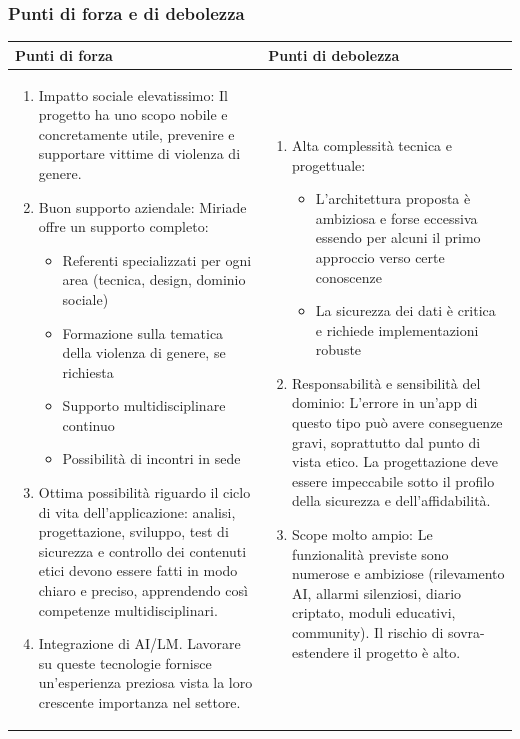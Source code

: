\documentclass[a4paper,11pt]{article}
\begin{document}
\subsubsection{Punti di forza e di debolezza}
{\footnotesize
\begin{tabularx}{\textwidth}{|X|X|}
\hline
\rowcolor{lightgray!40} %
\textbf{Punti di forza} & \textbf{Punti di debolezza} \\
\hline
\begin{enumerate}
\item Impatto sociale elevatissimo: Il progetto ha uno scopo nobile e concretamente utile, prevenire e supportare vittime di violenza di genere.
\item Buon supporto aziendale: Miriade offre un supporto completo:
\begin{itemize}
 \item Referenti specializzati per ogni area (tecnica, design, dominio sociale)
 \item Formazione sulla tematica della violenza di genere, se richiesta
 \item Supporto multidisciplinare continuo
 \item Possibilità di incontri in sede
\end{itemize}
\item Ottima possibilità riguardo il ciclo di vita dell'applicazione: analisi, progettazione, sviluppo, test di sicurezza e controllo dei contenuti etici devono essere fatti in modo chiaro e preciso, apprendendo così competenze multidisciplinari.
\item Integrazione di AI/LM. Lavorare su queste tecnologie fornisce un'esperienza preziosa vista la loro crescente importanza nel settore.
\end{enumerate}
 & \begin{enumerate}
\item Alta complessità tecnica e progettuale:
\begin{itemize}
 \item L'architettura proposta è ambiziosa e forse eccessiva essendo per alcuni il primo approccio verso certe conoscenze
 \item La sicurezza dei dati è critica e richiede implementazioni robuste
\end{itemize}
\item 	Responsabilità e sensibilità del dominio: L'errore in un'app di questo tipo può avere conseguenze gravi, soprattutto dal punto di vista etico. La progettazione deve essere impeccabile sotto il profilo della sicurezza e dell'affidabilità.
\item Scope molto ampio: Le funzionalità previste sono numerose e ambiziose (rilevamento AI, allarmi silenziosi, diario criptato, moduli educativi, community). Il rischio di sovra-estendere il progetto è alto.
\end{enumerate} \\
\hline
\end{tabularx}
}
\end{document}

